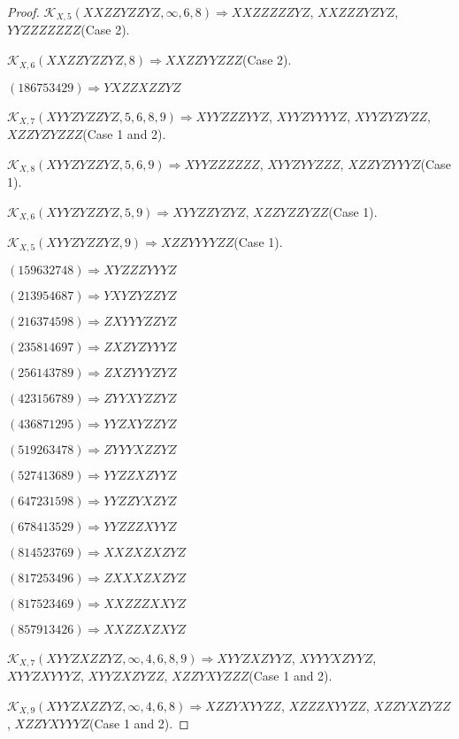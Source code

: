 \documentclass[12pt]{article}
\theoremstyle{plain}
\theoremstyle{definition}
\theoremstyle{remark}
\newcommand{\fancy}[1]{\mathcal{#1}}
\def\K{\fancy{K}}
\begin{document}
\begin{proof}
	$\K_{X,5}(XXZZYZZYZ,\infty,6, 8)\Rightarrow $$XXZZZZZYZ$, $XXZZZYZYZ$, $YYZZZZZZZ$(Case 2).
	
	$\K_{X,6}(XXZZYZZYZ,8)\Rightarrow $$XXZZYYZZZ$(Case 2).
	
	
	
	$(1 8 6 7 5 3 4 2 9)\Rightarrow YXZZXZZYZ$
	
	
	
	$\K_{X,7}(XYYZYZZYZ,5, 6, 8, 9)\Rightarrow $$XYYZZZYYZ$, $XYYZYYYYZ$, $XYYZYZYZZ$, $XZZYZYZZZ$(Case 1 and 2).
	
	$\K_{X,8}(XYYZYZZYZ,5, 6, 9)\Rightarrow $$XYYZZZZZZ$, $XYYZYYZZZ$, $XZZYZYYYZ$(Case 1).
	
	$\K_{X,6}(XYYZYZZYZ,5, 9)\Rightarrow $$XYYZZYZYZ$, $XZZYZZYZZ$(Case 1).
	
	$\K_{X,5}(XYYZYZZYZ,9)\Rightarrow $$XZZYYYYZZ$(Case 1).
	
	
	
	$(1 5 9 6 3 2 7 4 8)\Rightarrow XYZZZYYYZ$
	
	$(2 1 3 9 5 4 6 8 7)\Rightarrow YXYZYZZYZ$
	
	$(2 1 6 3 7 4 5 9 8)\Rightarrow ZXYYYZZYZ$
	
	$(2 3 5 8 1 4 6 9 7)\Rightarrow ZXZYZYYYZ$
	
	$(2 5 6 1 4 3 7 8 9)\Rightarrow ZXZYYYZYZ$
	
	$(4 2 3 1 5 6 7 8 9)\Rightarrow ZYYXYZZYZ$
	
	$(4 3 6 8 7 1 2 9 5)\Rightarrow YYZXYZZYZ$
	
	$(5 1 9 2 6 3 4 7 8)\Rightarrow ZYYYXZZYZ$
	
	$(5 2 7 4 1 3 6 8 9)\Rightarrow YYZZXZYYZ$
	
	$(6 4 7 2 3 1 5 9 8)\Rightarrow YYZZYXZYZ$
	
	$(6 7 8 4 1 3 5 2 9)\Rightarrow YYZZZXYYZ$
	
	$(8 1 4 5 2 3 7 6 9)\Rightarrow XXZXZXZYZ$
	
	$(8 1 7 2 5 3 4 9 6)\Rightarrow ZXXXZXZYZ$
	
	$(8 1 7 5 2 3 4 6 9)\Rightarrow XXZZZXXYZ$
	
	$(8 5 7 9 1 3 4 2 6)\Rightarrow XXZZXZXYZ$
	
	
	
	$\K_{X,7}(XYYZXZZYZ,\infty,4, 6, 8, 9)\Rightarrow $$XYYZXZYYZ$, $XYYYXZYYZ$, $XYYZXYYYZ$, $XYYZXZYZZ$, $XZZYXYZZZ$(Case 1 and 2).
	
	$\K_{X,9}(XYYZXZZYZ,\infty,4, 6, 8)\Rightarrow $$XZZYXYYZZ$, $XZZZXYYZZ$, $XZZYXZYZZ$, $XZZYXYYYZ$(Case 1 and 2).
	

\end{proof}
\end{document}
